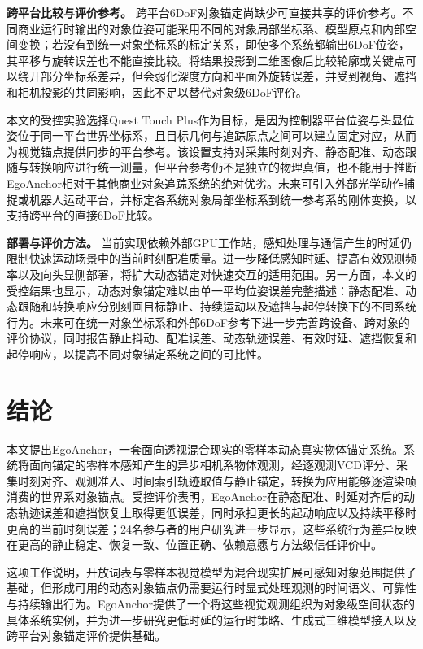 \documentclass[review]{vgtc}
\begin{document}
\textbf{跨平台比较与评价参考。}
跨平台6DoF对象锚定尚缺少可直接共享的评价参考。不同商业运行时输出的对象位姿可能采用不同的对象局部坐标系、模型原点和内部空间变换；若没有到统一对象坐标系的标定关系，即使多个系统都输出6DoF位姿，其平移与旋转误差也不能直接比较。将结果投影到二维图像后比较轮廓或关键点可以绕开部分坐标系差异，但会弱化深度方向和平面外旋转误差，并受到视角、遮挡和相机投影的共同影响，因此不足以替代对象级6DoF评价。

本文的受控实验选择Quest Touch Plus作为目标，是因为控制器平台位姿与头显位姿位于同一平台世界坐标系，且目标几何与追踪原点之间可以建立固定对应，从而为视觉锚点提供同步的平台参考。该设置支持对采集时刻对齐、静态配准、动态跟随与转换响应进行统一测量，但平台参考仍不是独立的物理真值，也不能用于推断EgoAnchor相对于其他商业对象追踪系统的绝对优劣。未来可引入外部光学动作捕捉或机器人运动平台，并标定各系统对象局部坐标系到统一参考系的刚体变换，以支持跨平台的直接6DoF比较。

\textbf{部署与评价方法。}
当前实现依赖外部GPU工作站，感知处理与通信产生的时延仍限制快速运动场景中的当前时刻配准质量。进一步降低感知时延、提高有效观测频率以及向头显侧部署，将扩大动态锚定对快速交互的适用范围。另一方面，本文的受控结果也显示，动态对象锚定难以由单一平均位姿误差完整描述：静态配准、动态跟随和转换响应分别刻画目标静止、持续运动以及遮挡与起停转换下的不同系统行为。未来可在统一对象坐标系和外部6DoF参考下进一步完善跨设备、跨对象的评价协议，同时报告静止抖动、配准误差、动态轨迹误差、有效时延、遮挡恢复和起停响应，以提高不同对象锚定系统之间的可比性。


\section{结论}\label{sec:conclusion}

本文提出EgoAnchor，一套面向透视混合现实的零样本动态真实物体锚定系统。系统将面向锚定的零样本感知产生的异步相机系物体观测，经逐观测VCD评分、采集时刻对齐、观测准入、时间索引轨迹取值与静止锚定，转换为应用能够逐渲染帧消费的世界系对象锚点。受控评价表明，EgoAnchor在静态配准、时延对齐后的动态轨迹误差和遮挡恢复上取得更低误差，同时承担更长的起动响应以及持续平移时更高的当前时刻误差；24名参与者的用户研究进一步显示，这些系统行为差异反映在更高的静止稳定、恢复一致、位置正确、依赖意愿与方法级信任评价中。

这项工作说明，开放词表与零样本视觉模型为混合现实扩展可感知对象范围提供了基础，但形成可用的动态对象锚点仍需要运行时显式处理观测的时间语义、可靠性与持续输出行为。EgoAnchor提供了一个将这些视觉观测组织为对象级空间状态的具体系统实例，并为进一步研究更低时延的运行时策略、生成式三维模型接入以及跨平台对象锚定评价提供基础。
\end{document}
